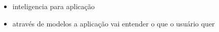 
\begin{itemize}
	\item inteligencia para aplicação
	\item através de modelos a aplicação vai entender o que o usuário quer
\end{itemize}

